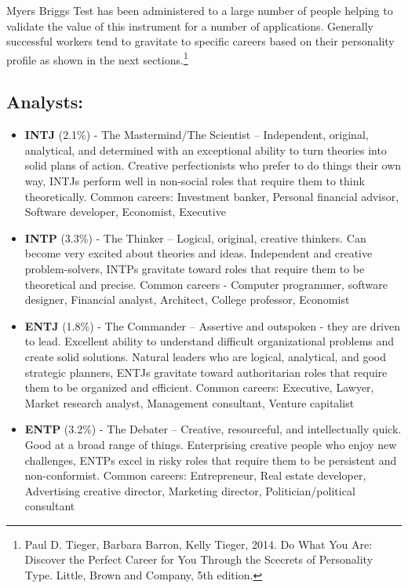\documentclass[]{book}
\let\rmarkdownfootnote\footnote%
\def\footnote{\protect\rmarkdownfootnote}
\begin{document}
Myers Briggs Test has been administered to a large number of people helping to validate the value of this instrument for a number of applications. Generally successful workers tend to gravitate to specific careers based on their personality profile as shown in the next sections.\footnote{Paul D. Tieger, Barbara Barron, Kelly Tieger, 2014. Do What You Are: Discover the Perfect Career for You Through the Scecrets of Personality Type. Little, Brown and Company, 5th edition.}

\hypertarget{analysts}{%
\subsection{Analysts:}\label{analysts}}

\begin{itemize}
\item
  \textbf{INTJ} (2.1\%) - The Mastermind/The Scientist -- Independent, original, analytical, and determined with an exceptional ability to turn theories into solid plans of action. Creative perfectionists who prefer to do things their own way, INTJs perform well in non-social roles that require them to think theoretically. Common careers: Investment banker, Personal financial advisor, Software developer, Economist, Executive
\item
  \textbf{INTP} (3.3\%) - The Thinker -- Logical, original, creative thinkers. Can become very excited about theories and ideas. Independent and creative problem-solvers, INTPs gravitate toward roles that require them to be theoretical and precise. Common careers - Computer programmer, software designer, Financial analyst, Architect, College professor, Economist
\item
  \textbf{ENTJ} (1.8\%) - The Commander -- Assertive and outspoken - they are driven to lead. Excellent ability to understand difficult organizational problems and create solid solutions. Natural leaders who are logical, analytical, and good strategic planners, ENTJs gravitate toward authoritarian roles that require them to be organized and efficient. Common careers: Executive, Lawyer, Market research analyst, Management consultant, Venture capitalist
\item
  \textbf{ENTP} (3.2\%) - The Debater -- Creative, resourceful, and intellectually quick. Good at a broad range of things. Enterprising creative people who enjoy new challenges, ENTPs excel in risky roles that require them to be persistent and non-conformist. Common careers: Entrepreneur, Real estate developer, Advertising creative director, Marketing director, Politician/political consultant
\end{itemize}
\end{document}
